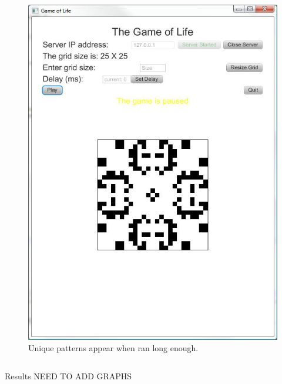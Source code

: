 \documentclass[final]{beamer}
\newlength{\onecolwid}
\newlength{\twocolwid}
\begin{document}
\begin{frame}[t]
\begin{columns}[t]
\begin{column}{\twocolwid}
\begin{columns}[t,totalwidth=\twocolwid]
\begin{column}{\onecolwid}\vspace{-.6in} %
\begin{block}{}
\begin{figure}
\includegraphics[width=.7\linewidth]{gol2.jpg}
\centering \caption{Unique patterns appear when ran long enough.}
\end{figure}
\end{block}

\end{column} %

\end{columns} %

\begin{columns}[t,totalwidth=\twocolwid] %

\begin{column}{\twocolwid} %


\begin{block}{Results}
NEED TO ADD GRAPHS
\end{block}


\end{column}
\end{columns}
\end{column}
\end{columns}
\end{frame}
\end{document}
